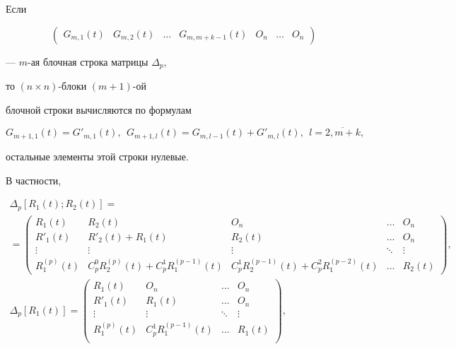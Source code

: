 Если


$$


\begin{pmatrix}


G_{m,1}(t) & G_{m,2}(t) & \dotsc & G_{m,m+k-1}(t) & O_n & \dotsc & O_n


\end{pmatrix}


$$


--- $m$-ая блочная строка матрицы $\Delta_p$,


то $(n \times n)$-блоки $(m+1)$-ой


блочной строки вычисляются по формулам


$$


G_{m+1,1}(t)=G'_{m,1}(t), \ \


G_{m+1,l}(t)=G_{m,l-1}(t)+G'_{m,l}(t), \ \ l=\overline{2,m+k},


$$


остальные элементы этой строки нулевые.





В частности, 


\begin{gather*}


\Delta_p[R_1(t);R_2(t)]= \\


=


\begin{pmatrix}


R_1(t) & R_2(t) & O_n & \dotsc & O_n\\


R'_1(t) & R'_2(t)+R_1(t) & R_2(t) & \dotsc & O_n\\


\vdots & \vdots & \vdots & \ddots & \vdots \\


R_1^{(p)}(t) & C_p^0 R_2^{(p)}(t)+C_p^1R_1^{(p-1)}(t) &


C_p^1 R_2^{(p-1)}(t)+C_p^2R_1^{(p-2)}(t) & \dotsc & R_2(t)


\end{pmatrix}, \\


%


\Delta_p[R_1(t)]=


\begin{pmatrix}


R_1(t) & O_n & \dotsc & O_n\\


R'_1(t) & R_1(t) & \dotsc & O_n\\


\vdots & \vdots & \ddots & \vdots \\


R_1^{(p)}(t) & C_p^1 R_1^{(p-1)}(t) & \dotsc & R_1(t)\\


\end{pmatrix}


,


\end{gather*}


